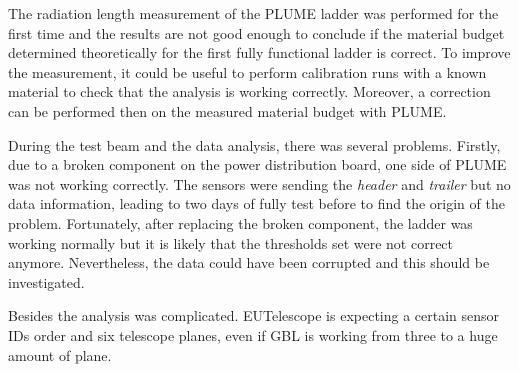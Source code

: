   The radiation length measurement of the \gls{PLUME} ladder was performed for the first time and the results are not good enough to conclude if the material budget determined theoretically for the first fully functional ladder is correct.
  To improve the measurement, it could be useful to perform calibration runs with a known material to check that the analysis is working correctly.
  Moreover, a correction can be performed then on the measured material budget with \gls{PLUME}.

  During the test beam and the data analysis, there was several problems.
  Firstly, due to a broken component on the power distribution board, one side of \gls{PLUME} was not working correctly.
  The sensors were sending the \textit{header} and \textit{trailer} but no data information, leading to two days of fully test before to find the origin of the problem.
  Fortunately, after replacing the broken component, the ladder was working normally but it is likely that the thresholds set were not correct anymore.
  Nevertheless, the data could have been corrupted and this should be investigated.

  Besides the analysis was complicated.
  EUTelescope is expecting a certain sensor IDs order and six telescope planes, even if \gls{GBL} is working from three to a huge amount of plane.
